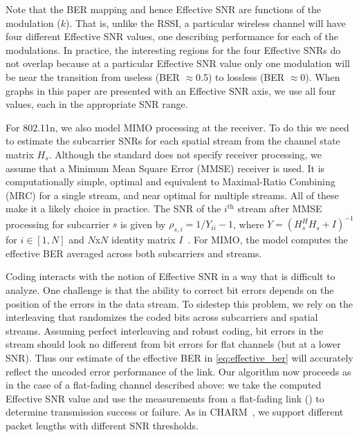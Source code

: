 Note that the BER mapping and hence Effective SNR are functions of the modulation ($k$). That is, unlike the RSSI, a particular wireless channel will have four different Effective SNR values, one describing performance for each of the modulations. In practice, the interesting regions for the four Effective SNRs do not overlap because at a particular Effective SNR value only one modulation will be near the transition from useless (BER $\approx$0.5) to lossless (BER $\approx$0). When graphs in this paper are presented with an Effective SNR axis, we use all four values, each in the appropriate SNR range.

For 802.11n, we also model MIMO processing at the receiver. To do this we need to estimate the subcarrier SNRs for each spatial stream from the channel state matrix $H_s$. Although the standard does not specify receiver processing, 
we assume that a Minimum Mean Square Error (MMSE) receiver is used. It is computationally simple, optimal and equivalent to Maximal-Ratio Combining (MRC) for a single stream, and near optimal for multiple streams. 
All of these make it a likely choice in practice.
The SNR of the $i^{\text{th}}$ stream after MMSE processing for subcarrier $s$ is 
given by $\rho_{s,i} = 1/Y_{ii}-1$, where
	$Y = \left(H_s^H H_s+I\right)^{-1}$
for $i \in [1,N]$ and $N$x$N$ identity matrix $I$~\cite{Tse}. For MIMO, the model computes the effective BER averaged across both subcarriers and streams.

Coding interacts with the notion of Effective SNR in a way that is difficult to analyze. One challenge is that the ability to correct bit errors depends on the position of the errors in the data stream. To sidestep this problem, we rely on the interleaving that randomizes the coded bits across subcarriers and spatial streams. Assuming perfect interleaving and robust coding, bit errors in the stream should look no different from bit errors for flat channels (but at a lower SNR). Thus our estimate of the effective BER in \eqref{eq:effective_ber} will accurately reflect the uncoded error performance of the link. Our algorithm now proceeds as in the case of a flat-fading channel described above: we take the computed Effective SNR value and use the measurements from a flat-fading link () to determine transmission success or failure. As in CHARM~\cite{Judd_CHARM}, we support different packet lengths with different SNR thresholds.

